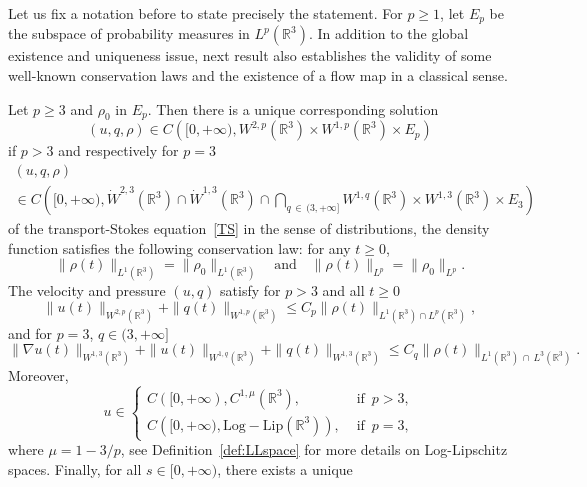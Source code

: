 \documentclass[AHL,Unicode,longabstracts,published]{cedram}
\newcommand{\LLip}{\mathrm{Log-Lip}}
\newcommand{\R}{\mathbb{R}}
\renewcommand{\leq}{\leqslant}
\renewcommand{\geq}{\geqslant}
\begin{document}
Let us fix a notation before to state precisely the statement. For $p\geq 1$, let $E_p$ be the subspace of probability measures in $ L^p (\R^3) $. In addition to the global existence and uniqueness issue, next result also establishes the validity of some well-known conservation laws and the existence of a flow map in a classical sense.
\begin{theo} \label{thm0}
Let $p\geq 3$ and $\rho_0$ in $E_p$. Then there is a unique corresponding solution
\[
(u,q,\rho) \in C\left([0,+\infty),W^{2,p} \left(\R^3\right) \times W^{1,p} \left(\R^3\right)\times E_p\right)
\]
if $p>3$ and respectively for $p=3$
\begin{multline*}
(u,q,\rho) \\
\in C\left([0,+\infty),\dot{W}^{2,3} \left(\R^3\right) 
\cap \dot{W}^{1,3} \left(\R^3\right)\cap \underset{q\,\in\,(3,+\infty]}{\bigcap} W^{1,q}\left(\R^3\right) \times W^{1,3} \left(\R^3\right)\times E_3\right)
\end{multline*}
of the transport-Stokes equation~\eqref{TS} in the sense of distributions, the density function satisfies the following conservation law: for any $t\geq 0$,
\begin{equation}\label{conserLp}
\|\rho(t)\|_{ L^1 \left(\R^3\right) } =\|\rho_0\|_{ L^1 \left(\R^3\right) } \quad \text{and} \quad \|\rho(t)\|_{L^p} =\|\rho_0\|_{L^p}.
\end{equation}
The velocity and pressure $(u,q)$ satisfy for $p>3$ and all $t\geq 0$
\begin{equation}\label{reg_u,p}
\|u(t)\|_{W^{2,p}\left(\R^3\right)}+ \|q(t)\|_{W^{1,p}\left(\R^3\right)} \leq C_p \| \rho(t) \|_{L^1\left(\R^3\right)\cap L^p\left(\R^3\right)},
\end{equation}
and for $p=3$, $q\in(3,+\infty]$
\begin{equation}\label{reg_u,p_bis}
\|\nabla u(t)\|_{W^{1,3}\left(\R^3\right)}+\|u(t)\|_{W^{1,q}\left(\R^3\right)}+ \|q(t)\|_{W^{1,3}\left(\R^3\right)} \leq C_q \| \rho(t) \|_{L^1\left(\R^3\right)\,\cap\,L^3\left(\R^3\right)}.
\end{equation}
Moreover,
\begin{equation}\label{ulipoullip}
u \in
\begin{cases}
C([0,+\infty), C^{1,\mu} \left(\R^3\right), & \text{ if } \, p > 3,
\\ C\left([0,+\infty), \LLip \left(\R^3\right)\right), & \text{ if } \, p = 3,
\end{cases}
\end{equation}
where $\mu=1-3/p$, see Definition~\ref{def:LLspace} for more details on Log-Lipschitz spaces. Finally, for all $s\in[0,+\infty)$, there exists a unique

\end{theo}
\end{document}
